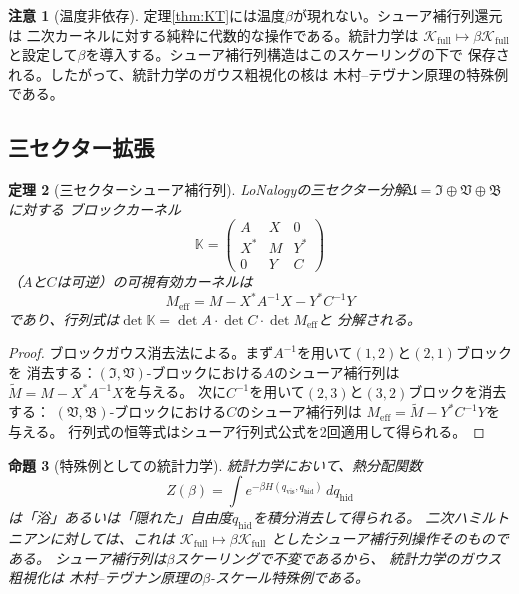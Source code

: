 \documentclass[12pt]{article}
\theoremstyle{plain}
\newtheorem{theorem}{定理}[section]
\newtheorem{proposition}[theorem]{命題}
\theoremstyle{definition}
\newtheorem{remark}[theorem]{注意}
\numberwithin{equation}{section}
\newcommand{\vis}{\mathrm{vis}}
\newcommand{\eff}{\mathrm{eff}}
\newcommand{\hid}{\mathrm{hid}}
\newcommand{\fU}{\mathfrak{U}}
\newcommand{\fI}{\mathfrak{I}}
\newcommand{\fV}{\mathfrak{V}}
\newcommand{\fB}{\mathfrak{B}}
\begin{document}
\begin{remark}[温度非依存]
定理\ref{thm:KT}には温度$\beta$が現れない。シューア補行列還元は
二次カーネルに対する純粋に代数的な操作である。統計力学は
$\mathcal{K}_{\mathrm{full}}\mapsto\beta\mathcal{K}_{\mathrm{full}}$
と設定して$\beta$を導入する。シューア補行列構造はこのスケーリングの下で
保存される。したがって、統計力学のガウス粗視化の核は
木村--テヴナン原理の特殊例である。
\end{remark}

\subsection{三セクター拡張}

\begin{theorem}[三セクターシューア補行列]\label{thm:threesector}
LoNalogyの三セクター分解$\fU=\fI\oplus\fV\oplus\fB$に対する
ブロックカーネル
\begin{equation}
\mathbb{K} = \begin{pmatrix}
A & X & 0\\
X^* & M & Y^*\\
0 & Y & C
\end{pmatrix}
\end{equation}
（$A$と$C$は可逆）の可視有効カーネルは
\begin{equation}
\boxed{M_{\eff} = M - X^*A^{-1}X - Y^*C^{-1}Y}
\end{equation}
であり、行列式は$\det\mathbb{K}=\det A\cdot\det C\cdot\det M_{\eff}$と
分解される。
\end{theorem}

\begin{proof}
ブロックガウス消去法による。まず$A^{-1}$を用いて$(1,2)$と$(2,1)$ブロックを
消去する：$(\fI,\fV)$-ブロックにおける$A$のシューア補行列は
$\widetilde{M}=M-X^*A^{-1}X$を与える。
次に$C^{-1}$を用いて$(2,3)$と$(3,2)$ブロックを消去する：
$(\fV,\fB)$-ブロックにおける$C$のシューア補行列は
$M_{\eff}=\widetilde{M}-Y^*C^{-1}Y$を与える。
行列式の恒等式はシューア行列式公式を2回適用して得られる。
\end{proof}

\begin{proposition}[特殊例としての統計力学]\label{prop:statmech}
統計力学において、熱分配関数
\[
Z(\beta) = \int e^{-\beta H(q_{\vis},q_{\hid})}\,dq_{\hid}
\]
は「浴」あるいは「隠れた」自由度$q_{\hid}$を積分消去して得られる。
二次ハミルトニアンに対しては、これは
$\mathcal{K}_{\mathrm{full}}\mapsto
\beta\mathcal{K}_{\mathrm{full}}$
としたシューア補行列操作そのものである。
シューア補行列は$\beta$スケーリングで不変であるから、
統計力学のガウス粗視化は
木村--テヴナン原理の$\beta$-スケール特殊例である。
\end{proposition}
\end{document}
